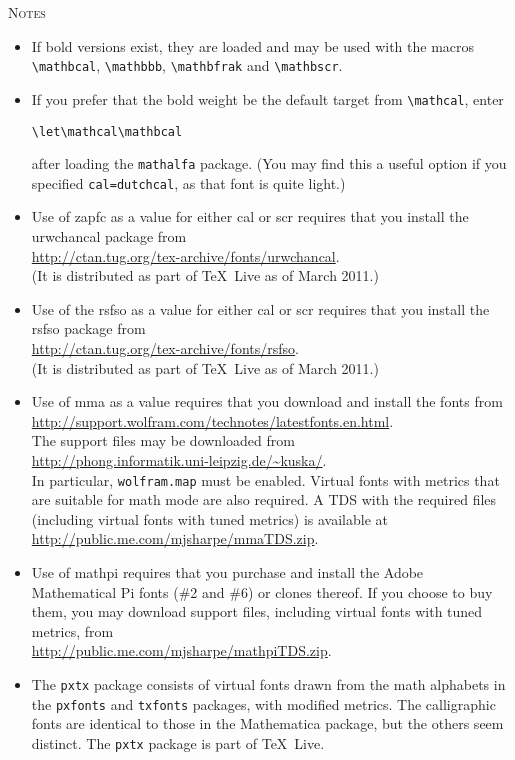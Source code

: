 \documentclass[11pt]{amsart}
\begin{document}
\textsc{Notes}
\begin{itemize}
\item If bold versions exist, they are loaded and may be used with the macros \verb|\mathbcal|, \verb|\mathbbb|, \verb|\mathbfrak| and \verb|\mathbscr|.
\item If you prefer that the bold weight be the default target from \verb|\mathcal|, enter
\begin{verbatim}
\let\mathcal\mathbcal
\end{verbatim}
after loading the {\tt mathalfa} package. (You may find this a useful option if you specified {\tt cal=dutchcal}, as that font is quite light.)
\item
Use of \textsf{zapfc} as a value for either \textsf{cal} or \textsf{scr} requires that you install the \textsf{urwchancal} package from\\
 \url{http://ctan.tug.org/tex-archive/fonts/urwchancal}.\\
  (It is distributed as part of \TeX\ Live as of March 2011.)
\item Use of the \textsf{rsfso} as a value for either \textsf{cal} or \textsf{scr} requires that you install the \textsf{rsfso} package from\\
 \url{http://ctan.tug.org/tex-archive/fonts/rsfso}.\\
  (It is distributed as part of \TeX\ Live as of March 2011.)
\item Use of \textsf{mma} as a value  requires that you download and install the fonts from\\
\url{http://support.wolfram.com/technotes/latestfonts.en.html}.\\ 
The support files may be downloaded from\\
\url{http://phong.informatik.uni-leipzig.de/~kuska/}.\\
In particular, {\tt wolfram.map} must be enabled. Virtual fonts with metrics that are suitable for math mode are also required. A TDS with the required files (including virtual fonts with tuned metrics) is available at\\ \url{http://public.me.com/mjsharpe/mmaTDS.zip}.
\item Use of \textsf{mathpi}  requires that you purchase and install the Adobe Mathematical Pi fonts (\#2 and \#6) or  clones thereof. If you choose to buy them, you may download support files, including virtual fonts with tuned metrics, from \\
\url{http://public.me.com/mjsharpe/mathpiTDS.zip}.
\item The {\tt pxtx} package consists of virtual fonts drawn from the math alphabets in the {\tt pxfonts} and {\tt txfonts} packages, with modified metrics. The calligraphic fonts are identical to those in the Mathematica package, but the others seem distinct. The {\tt pxtx} package is part of \TeX\ Live.

\end{itemize}
\end{document}
